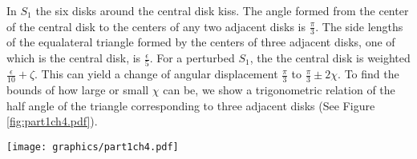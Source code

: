 In $S_1$ the six disks around the central disk kiss.  
The angle formed from the center of the central disk to the centers of any two adjacent disks is $\frac{\pi}{3}$.  
The side lengths of the equalateral triangle formed by the centers of three adjacent disks, one of which is the central disk, is $\frac{\epsilon}{5}$.  
For a perturbed $S_1$, the the central disk is weighted $\frac{\epsilon}{10} + \zeta$.  
This can yield a change of angular displacement $\frac{\pi}{3}$ to $\frac{\pi}{3} \pm 2\chi$.  
To find the bounds of how large or small $\chi$ can be, we show a trigonometric relation of the half angle of the triangle corresponding to three adjacent disks (See Figure \ref{fig:part1ch4.pdf}).

\begin{minipage}{\linewidth}
\begin{center}
\texttt{[image: graphics/part1ch4.pdf]}
\label{fig:part1ch4.pdf}
\end{center}
\end{minipage}

